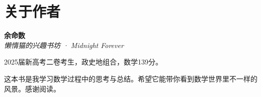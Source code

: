 
\chapter*{关于作者}

\vspace{0.5cm}

{\Large\sffamily\bfseries 余命数}\\[0.2cm]
{\small\sffamily\itshape 懒惰猫的兴趣书坊 · Midnight Forever}\\[0.5cm]

{\small
  2025届新高考二卷考生，政史地组合，数学139分。

  \vspace{0.5em}

  这本书是我学习数学过程中的思考与总结。希望它能带你看到数学世界里不一样的风景。感谢阅读。}

\vspace{0.8cm}

\begin{center}
\end{center}

\vspace{0.8cm}


\vspace{0.5cm}

